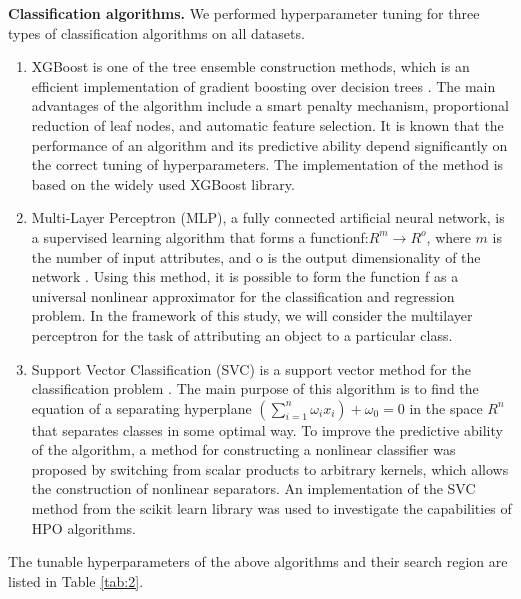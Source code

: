 \documentclass[preprint,12pt]{elsarticle}
\begin{document}
\textbf{Classification algorithms.} We performed hyperparameter tuning for three types of classification algorithms on all datasets.
\begin{enumerate}
	\item XGBoost is one of the tree ensemble construction methods, which is an efficient implementation of gradient boosting over decision trees \cite{XGBoost2016}. The main advantages of the algorithm include a smart penalty mechanism, proportional reduction of leaf nodes, and automatic feature selection. It is known that the performance of an algorithm and its predictive ability depend significantly on the correct tuning of hyperparameters. The implementation of the method is based on the widely used XGBoost library.
 \item Multi-Layer Perceptron (MLP), a fully connected artificial neural network, is a supervised learning algorithm that forms a functionf:$R^m \to R^o$, where $m$ is the number of input attributes, and o is the output dimensionality of the network \cite{GARDNER19982627}. Using this method, it is possible to form the function f as a universal nonlinear approximator for the classification and regression problem. In the framework of this study, we will consider the multilayer perceptron for the task of attributing an object to a particular class.
 \item Support Vector Classification (SVC) is a support vector method for the classification problem \cite{SVC2003}. The main purpose of this algorithm is to find the equation of a separating hyperplane $(\sum_{i=1}^n \omega_i x_i)+\omega_0=0$ in the space $R^n$ that separates classes in some optimal way. To improve the predictive ability of the algorithm, a method for constructing a nonlinear classifier was proposed by switching from scalar products to arbitrary kernels, which allows the construction of nonlinear separators. An implementation of the SVC method from the scikit learn library was used to investigate the capabilities of HPO algorithms.

\end{enumerate}

The tunable hyperparameters of the above algorithms and their search region are listed in Table \ref{tab:2}.
\end{document}
